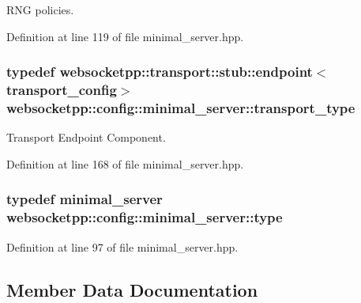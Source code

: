 R\+N\+G policies. 



Definition at line 119 of file minimal\+\_\+server.\+hpp.

\hypertarget{structwebsocketpp_1_1config_1_1minimal__server_a6e5badb1b21e44416a801ed216a3c72e}{}
\subsubsection[{transport\+\_\+type}]{\setlength{\rightskip}{0pt plus 5cm}typedef {\bf websocketpp\+::transport\+::stub\+::endpoint}$<${\bf transport\+\_\+config}$>$ {\bf websocketpp\+::config\+::minimal\+\_\+server\+::transport\+\_\+type}}\label{structwebsocketpp_1_1config_1_1minimal__server_a6e5badb1b21e44416a801ed216a3c72e}


Transport Endpoint Component. 



Definition at line 168 of file minimal\+\_\+server.\+hpp.

\hypertarget{structwebsocketpp_1_1config_1_1minimal__server_a2b417043c646c203ae97af495f5bc3b4}{}
\subsubsection[{type}]{\setlength{\rightskip}{0pt plus 5cm}typedef {\bf minimal\+\_\+server} {\bf websocketpp\+::config\+::minimal\+\_\+server\+::type}}\label{structwebsocketpp_1_1config_1_1minimal__server_a2b417043c646c203ae97af495f5bc3b4}


Definition at line 97 of file minimal\+\_\+server.\+hpp.



\subsection{Member Data Documentation}
\hypertarget{structwebsocketpp_1_1config_1_1minimal__server_ae71d1728a8d49acd97ec29a6fdfd440c}{}
